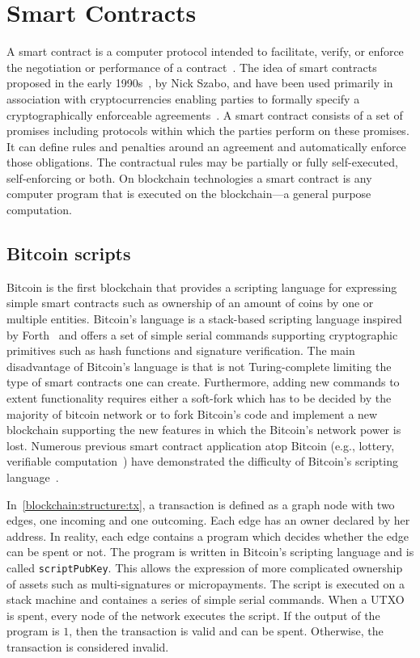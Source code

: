 \section{Smart Contracts}
\label{smart_contracts}

A smart contract is a computer protocol intended to facilitate, verify, or enforce the negotiation or performance of a contract~\cite{FM548,szabo1996smart}.
The idea of smart contracts proposed in the early 1990s~\cite{FM548}, by Nick Szabo, and have been used primarily in association with cryptocurrencies enabling
parties to formally specify a cryptographically enforceable agreements~\cite{7163021}. A smart contract consists of a set of promises including protocols within which the parties perform on these promises. It can define rules and penalties around an agreement and automatically enforce those obligations. The contractual rules may be partially or fully self-executed, self-enforcing or both. On blockchain technologies a smart contract is any computer program that is executed on the blockchain---a general purpose computation.

\subsection{Bitcoin scripts}
\label{smart_contracts:bitcoin}

Bitcoin is the first blockchain that provides a scripting language for expressing simple smart contracts such as ownership of an amount of coins by one or multiple entities. Bitcoin's language is a stack-based scripting language inspired by Forth~\cite{forth_lang} and offers a set of simple serial commands supporting cryptographic primitives such as hash functions and signature verification. The main disadvantage of Bitcoin's language is that is not Turing-complete limiting the type of smart contracts one can create. Furthermore, adding new commands to extent functionality requires either a soft-fork which has to be decided by the majority of bitcoin network or to fork Bitcoin's code and implement a new blockchain supporting the new features in which the Bitcoin's network power is lost. Numerous previous smart contract application atop Bitcoin (e.g., lottery\cite{Andrychowicz:2014:SMC:2650286.2650764,10.1007/978-3-662-44381-1_24}, verifiable computation~\cite{Kumaresan:2014:UBI:2660267.2660380}) have demonstrated the difficulty of Bitcoin's scripting language~\cite{cryptoeprint:2015:675}.

In~\ref{blockchain:structure:tx}, a transaction is defined as a graph node with two edges, one incoming and one outcoming. Each edge has an owner declared by her address. In reality, each edge contains a program which decides whether the edge can be spent or not. The program is written in Bitcoin's scripting language and is called \verb|scriptPubKey|. This allows the expression of more complicated ownership of assets such as multi-signatures or micropayments. The script is executed on a stack machine and containes a series of simple serial commands. When a UTXO is spent, every node of the network executes the script. If the output of the program is $1$, then the transaction is valid and can be spent. Otherwise, the transaction is considered invalid.

